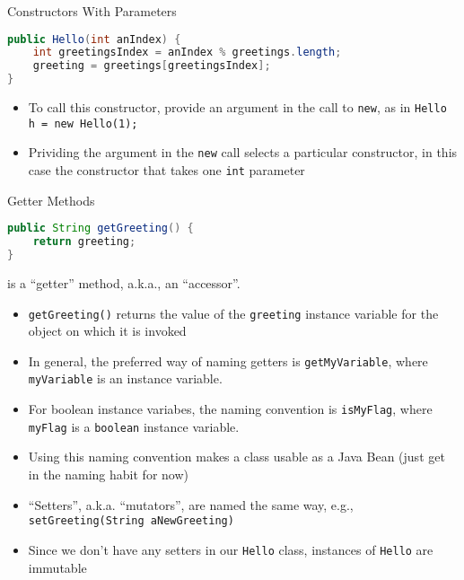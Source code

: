 \documentclass{beamer}
\begin{document}
\begin{frame}[fragile]{Constructors With Parameters}


\begin{lstlisting}[language=Java]
public Hello(int anIndex) {
    int greetingsIndex = anIndex % greetings.length;
    greeting = greetings[greetingsIndex];
}
\end{lstlisting}

\begin{itemize}
\item To call this constructor, provide an argument in the call to {\tt new}, as in {\tt Hello h = new Hello(1);}
\item Prividing the argument in the {\tt new} call selects a particular constructor, in this case the constructor that takes one {\tt int} parameter
\end{itemize}


\end{frame}

\begin{frame}[fragile]{Getter Methods}

\vspace{-.1in}
\begin{lstlisting}[language=Java]
public String getGreeting() {
    return greeting;
}
\end{lstlisting}
\vspace{-.1in}
is a ``getter'' method, a.k.a., an ``accessor''.
\begin{itemize}
\item {\tt getGreeting()} returns the value of the {\tt greeting} instance variable for the object on which it is invoked
\item In general, the preferred way of naming getters is {\tt getMyVariable}, where {\tt myVariable} is an instance variable.
\item For boolean instance variabes, the naming convention is {\tt isMyFlag}, where {\tt myFlag} is a {\tt boolean} instance variable.
\item Using this naming convention makes a class usable as a Java Bean (just get in the naming habit for now)
\item ``Setters'', a.k.a. ``mutators'', are named the same way, e.g., {\tt setGreeting(String aNewGreeting)}
\item Since we don't have any setters in our {\tt Hello} class, instances of {\tt Hello} are immutable
\end{itemize}


\end{frame}
\end{document}
